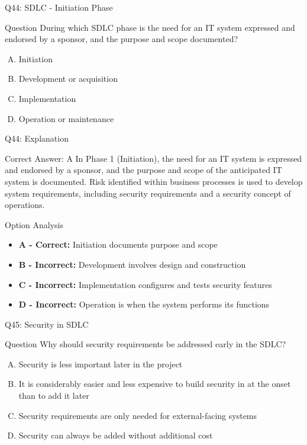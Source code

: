 \documentclass{beamer}
\begin{document}
	\begin{frame}{Q44: SDLC - Initiation Phase}
		\begin{block}{Question}
			During which SDLC phase is the need for an IT system expressed and endorsed by a sponsor, and the purpose and scope documented?
		\end{block}
		\begin{enumerate}[(A)]
			\item Initiation
			\item Development or acquisition
			\item Implementation
			\item Operation or maintenance
		\end{enumerate}
	\end{frame}
	
	\begin{frame}{Q44: Explanation}
		\begin{block}{Correct Answer: A}
			In Phase 1 (Initiation), the need for an IT system is expressed and endorsed by a sponsor, and the purpose and scope of the anticipated IT system is documented. Risk identified within business processes is used to develop system requirements, including security requirements and a security concept of operations.
		\end{block}
		\begin{block}{Option Analysis}
			\begin{itemize}
				\item \textbf{A - Correct:} Initiation documents purpose and scope
				\item \textbf{B - Incorrect:} Development involves design and construction
				\item \textbf{C - Incorrect:} Implementation configures and tests security features
				\item \textbf{D - Incorrect:} Operation is when the system performs its functions
			\end{itemize}
		\end{block}
	\end{frame}
	
	\begin{frame}{Q45: Security in SDLC}
		\begin{block}{Question}
			Why should security requirements be addressed early in the SDLC?
		\end{block}
		\begin{enumerate}[(A)]
			\item Security is less important later in the project
			\item It is considerably easier and less expensive to build security in at the onset than to add it later
			\item Security requirements are only needed for external-facing systems
			\item Security can always be added without additional cost
		\end{enumerate}
	\end{frame}
	
\end{document}
